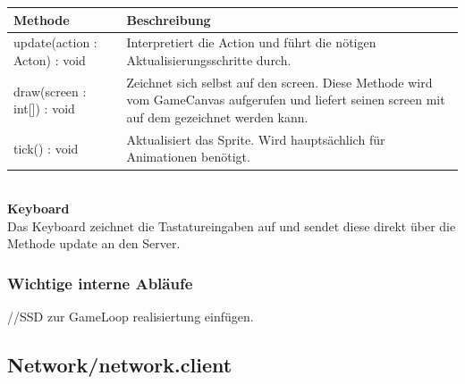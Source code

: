 \documentclass[11pt]{scrartcl}
\begin{document}
\begin{tabularx}{\linewidth}{l p{9cm}}
\textbf{Methode} & \textbf{Beschreibung}\\
\hline
update(action : Acton) : void & Interpretiert die Action und führt die nötigen Aktualisierungsschritte durch.\\
draw(screen : int[]) : void & Zeichnet sich selbst auf den screen. Diese Methode wird vom GameCanvas aufgerufen und liefert seinen screen mit auf dem gezeichnet werden kann.\\
tick() : void & Aktualisiert das Sprite. Wird hauptsächlich für Animationen benötigt.\\
\end{tabularx}\\

\textbf{Keyboard}\\
Das Keyboard zeichnet die Tastatureingaben auf und sendet diese direkt über die Methode update an den Server.

\subsubsection{Wichtige interne Abläufe}
//SSD zur GameLoop realisiertung einfügen.


\newpage

\subsection{Network/network.client}
\end{document}
